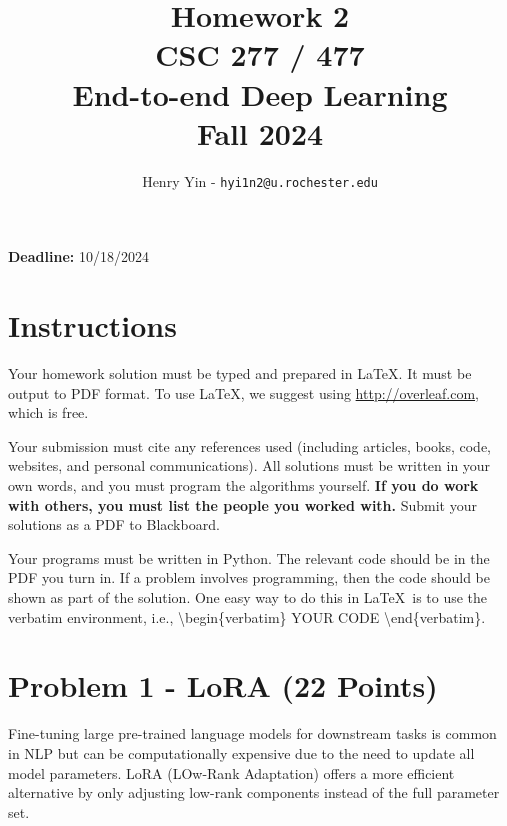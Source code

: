\documentclass[11pt, oneside]{article}   	%
\title{Homework 2 \\ CSC 277 / 477 \\ End-to-end Deep Learning \\ Fall 2024}
\author{Henry Yin - \texttt{hyi1n2@u.rochester.edu}}
\date{}
\begin{document}
\maketitle

\begin{center}
    \textbf{Deadline:} 10/18/2024
\end{center}


\section*{Instructions}

Your homework solution must be typed and prepared in \LaTeX. It must be output to PDF format. To use \LaTeX, we suggest using \url{http://overleaf.com}, which is free.

Your submission must cite any references used (including articles, books, code, websites, and personal communications).  All solutions must be written in your own words, and you must program the algorithms yourself. \textbf{If you do work with others, you must list the people you worked with.} Submit your solutions as a PDF to Blackboard. 


Your programs must be written in Python. The relevant code should be in the PDF you turn in. If a problem involves programming, then the code should be shown as part of the solution. One easy way to do this in \LaTeX \, is to use the verbatim environment, i.e., \textbackslash begin\{verbatim\} YOUR CODE \textbackslash end\{verbatim\}.










\clearpage



\section*{Problem 1 - LoRA (22 Points)}
Fine-tuning large pre-trained language models for downstream tasks is common in NLP but can be computationally expensive due to the need to update all model parameters. LoRA (LOw-Rank Adaptation) offers a more efficient alternative by only adjusting low-rank components instead of the full parameter set.
\end{document}
